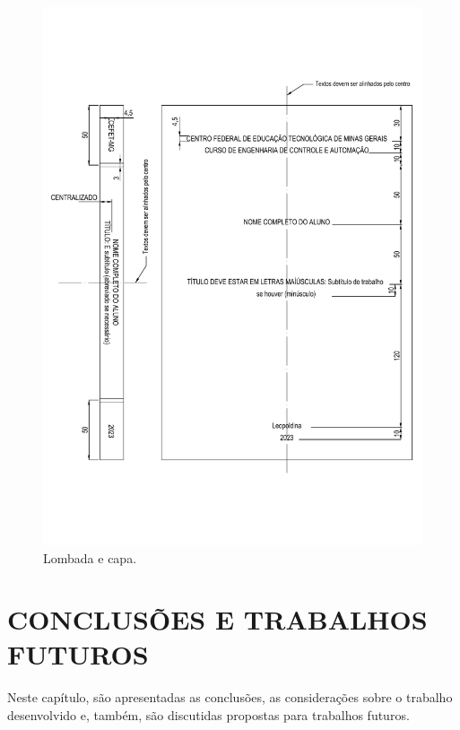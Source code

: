 \documentclass[
        oneside,      %
        english,			
        brazil			 
        ]{configcefetmglpd}
\begin{document}
\begin{figure}[h]
	\larguratexto{15cm}  %
	\caption{Lombada e capa.}
	\label{fig:lombada}
	\begin{center}
		\includegraphics[width=15cm]{lombada.pdf}
	\end{center}
\end{figure}

\chapter{CONCLUSÕES E TRABALHOS FUTUROS}

Neste capítulo, são apresentadas as conclusões, as considerações sobre o trabalho desenvolvido e, também, são discutidas propostas para trabalhos futuros.
\end{document}
